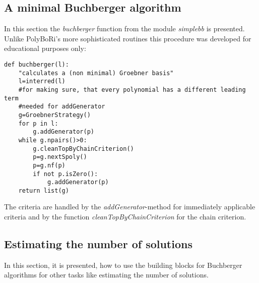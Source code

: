 \documentclass[]{article}
\newcommand{\PolyBoRi}{{\sc PolyBoRi}\xspace}
\newcommand{\functionname}[1]{\textit{#1}\xspace}
\newcounter{thm}
\begin{document}
\subsection{A minimal Buchberger algorithm}
In this section   the \functionname{buchberger} function from the module
\functionname{simplebb} is presented. Unlike \PolyBoRi's more sophisticated
routines this procedure was developed for educational purposes only:
\begin{verbatim}
def buchberger(l):
    "calculates a (non minimal) Groebner basis"
    l=interred(l)
    #for making sure, that every polynomial has a different leading term
    #needed for addGenerator
    g=GroebnerStrategy()
    for p in l:
        g.addGenerator(p)
    while g.npairs()>0:
        g.cleanTopByChainCriterion()
        p=g.nextSpoly()
        p=g.nf(p)
        if not p.isZero():
            g.addGenerator(p)
    return list(g)
\end{verbatim}
The criteria are handled by the \functionname{addGenerator}-method for
immediately applicable criteria and by the function \functionname{cleanTopByChainCriterion} for the chain criterion.


\subsection{Estimating the number of solutions}
In this section, it is presented, how to use the building blocks for Buchberger algorithms for other tasks like estimating the number of solutions.
\end{document}
